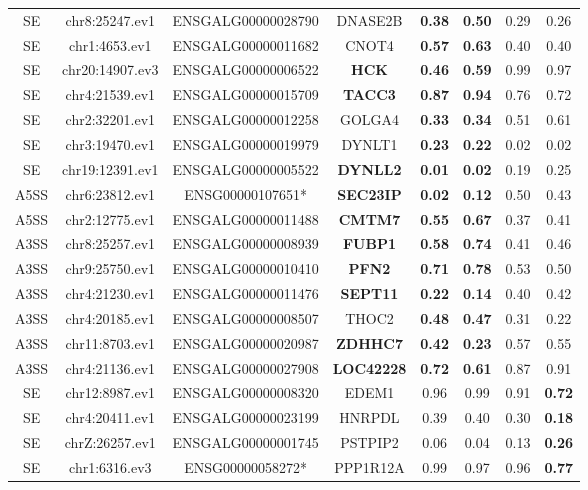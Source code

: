 \documentclass[10pt]{article}
\begin{document}
\begin{table}[!ht]
\begin{tabular}{cccccccc}
SE & chr8:25247.ev1 & ENSGALG00000028790 & DNASE2B & \textbf{0.38} & \textbf{0.50} & 0.29 & 0.26 \\
SE & chr1:4653.ev1 & ENSGALG00000011682 & CNOT4 & \textbf{0.57} & \textbf{0.63} & 0.40 & 0.40 \\
SE & chr20:14907.ev3 & ENSGALG00000006522 & \textbf{HCK} & \textbf{0.46} & \textbf{0.59} & 0.99 & 0.97 \\
SE & chr4:21539.ev1 & ENSGALG00000015709 & \textbf{TACC3} & \textbf{0.87} & \textbf{0.94} & 0.76 & 0.72 \\
SE & chr2:32201.ev1 & ENSGALG00000012258 & GOLGA4 & \textbf{0.33} & \textbf{0.34} & 0.51 & 0.61 \\
SE & chr3:19470.ev1 & ENSGALG00000019979 & DYNLT1 & \textbf{0.23} & \textbf{0.22} & 0.02 & 0.02 \\
SE & chr19:12391.ev1 & ENSGALG00000005522 & \textbf{DYNLL2} & \textbf{0.01} & \textbf{0.02} & 0.19 & 0.25 \\
A5SS & chr6:23812.ev1 & ENSG00000107651* & \textbf{SEC23IP} & \textbf{0.02} & \textbf{0.12} & 0.50 & 0.43 \\
A5SS & chr2:12775.ev1 & ENSGALG00000011488 & \textbf{CMTM7} & \textbf{0.55} & \textbf{0.67} & 0.37 & 0.41 \\
A3SS & chr8:25257.ev1 & ENSGALG00000008939 & \textbf{FUBP1} & \textbf{0.58} & \textbf{0.74} & 0.41 & 0.46 \\
A3SS & chr9:25750.ev1 & ENSGALG00000010410 & \textbf{PFN2} & \textbf{0.71} & \textbf{0.78} & 0.53 & 0.50 \\
A3SS & chr4:21230.ev1 & ENSGALG00000011476 & \textbf{SEPT11} & \textbf{0.22} & \textbf{0.14} & 0.40 & 0.42 \\
A3SS & chr4:20185.ev1 & ENSGALG00000008507 & THOC2 & \textbf{0.48} & \textbf{0.47} & 0.31 & 0.22 \\
A3SS & chr11:8703.ev1 & ENSGALG00000020987 & \textbf{ZDHHC7} & \textbf{0.42} & \textbf{0.23} & 0.57 & 0.55 \\
A3SS & chr4:21136.ev1 & ENSGALG00000027908 & \textbf{LOC42228} & \textbf{0.72} & \textbf{0.61} & 0.87 & 0.91 \\
\hline
SE & chr12:8987.ev1 & ENSGALG00000008320 & EDEM1 & 0.96 & 0.99 & 0.91 & \textbf{0.72} \\
SE & chr4:20411.ev1 & ENSGALG00000023199 & HNRPDL & 0.39 & 0.40 & 0.30 & \textbf{0.18} \\
SE & chrZ:26257.ev1 & ENSGALG00000001745 & PSTPIP2 & 0.06 & 0.04 & 0.13 & \textbf{0.26} \\
SE & chr1:6316.ev3 & ENSG00000058272* & PPP1R12A & 0.99 & 0.97 & 0.96 & \textbf{0.77} \\

\end{tabular}
\end{table}
\end{document}
